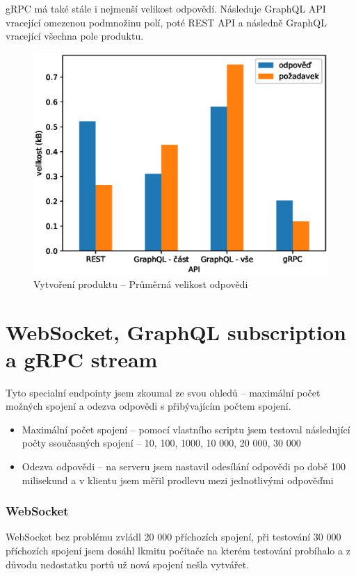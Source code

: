 \documentclass[thesis=M,czech]{FITthesis}[2019/12/23]
\begin{document}
gRPC má také stále i nejmenší velikost odpovědí. Následuje GraphQL API vracející omezenou podmnožinu polí, poté REST API a následně GraphQL vracející všechna pole produktu.
\begin{figure}[H]
  \includegraphics[width=\linewidth]{img/req-size-create.eps}
  \caption{Vytvoření produktu -- Průměrná velikost odpovědi}
\label{test_create_product_size}
\end{figure}

\section{WebSocket, GraphQL subscription a gRPC stream}
Tyto specialní endpointy jsem zkoumal ze svou ohledů -- maximální počet možných spojení a odezva odpovědi s přibývajícím počtem spojení.

\begin{itemize}
  \item Maximální počet spojení -- pomocí vlastního scriptu jsem testoval následující počty ssoučasných spojení --  10, 100, 1000, 10 000, 20 000, 30 000
  \item Odezva odpovědi -- na serveru jsem nastavil odesílání odpovědi po době 100 milisekund a v klientu jsem měřil prodlevu mezi jednotlivými odpověďmi
\end{itemize}

\subsubsection*{WebSocket}
WebSocket bez problému zvládl 20 000 příchozích spojení, při testování 30 000 příchozích spojení jsem dosáhl lkmitu počítače na kterém testování probíhalo a z důvodu nedostatku portů už nová spojení nešla vytvářet.
\end{document}
